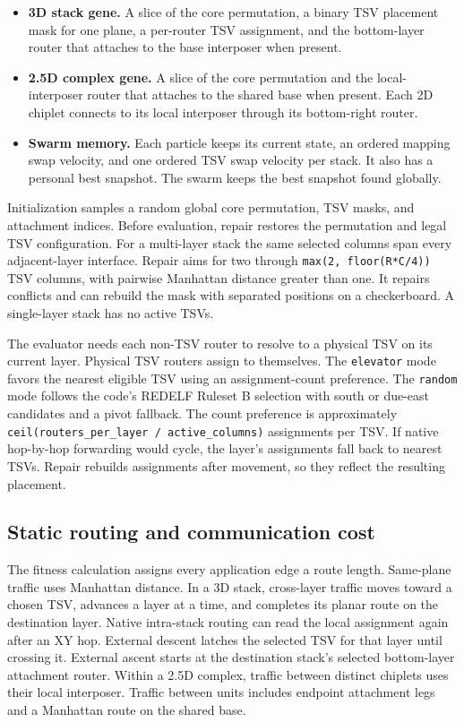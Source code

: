 \documentclass[11pt,a4paper]{article}
\begin{document}
\begin{itemize}
\item \textbf{3D stack gene.} A slice of the core permutation, a binary TSV placement mask for one plane, a per-router TSV assignment, and the bottom-layer router that attaches to the base interposer when present.
\item \textbf{2.5D complex gene.} A slice of the core permutation and the local-interposer router that attaches to the shared base when present. Each 2D chiplet connects to its local interposer through its bottom-right router.
\item \textbf{Swarm memory.} Each particle keeps its current state, an ordered mapping swap velocity, and one ordered TSV swap velocity per stack. It also has a personal best snapshot. The swarm keeps the best snapshot found globally.
\end{itemize}

Initialization samples a random global core permutation, TSV masks, and attachment indices. Before evaluation, repair restores the permutation and legal TSV configuration. For a multi-layer stack the same selected columns span every adjacent-layer interface. Repair aims for two through \texttt{max(2, floor(R*C/4))} TSV columns, with pairwise Manhattan distance greater than one. It repairs conflicts and can rebuild the mask with separated positions on a checkerboard. A single-layer stack has no active TSVs.

The evaluator needs each non-TSV router to resolve to a physical TSV on its current layer. Physical TSV routers assign to themselves. The \texttt{elevator} mode favors the nearest eligible TSV using an assignment-count preference. The \texttt{random} mode follows the code's REDELF Ruleset B selection with south or due-east candidates and a pivot fallback. The count preference is approximately \texttt{ceil(routers\_per\_layer / active\_columns)} assignments per TSV. If native hop-by-hop forwarding would cycle, the layer's assignments fall back to nearest TSVs. Repair rebuilds assignments after movement, so they reflect the resulting placement.

\subsection{Static routing and communication cost}

The fitness calculation assigns every application edge a route length. Same-plane traffic uses Manhattan distance. In a 3D stack, cross-layer traffic moves toward a chosen TSV, advances a layer at a time, and completes its planar route on the destination layer. Native intra-stack routing can read the local assignment again after an XY hop. External descent latches the selected TSV for that layer until crossing it. External ascent starts at the destination stack's selected bottom-layer attachment router. Within a 2.5D complex, traffic between distinct chiplets uses their local interposer. Traffic between units includes endpoint attachment legs and a Manhattan route on the shared base.
\end{document}
